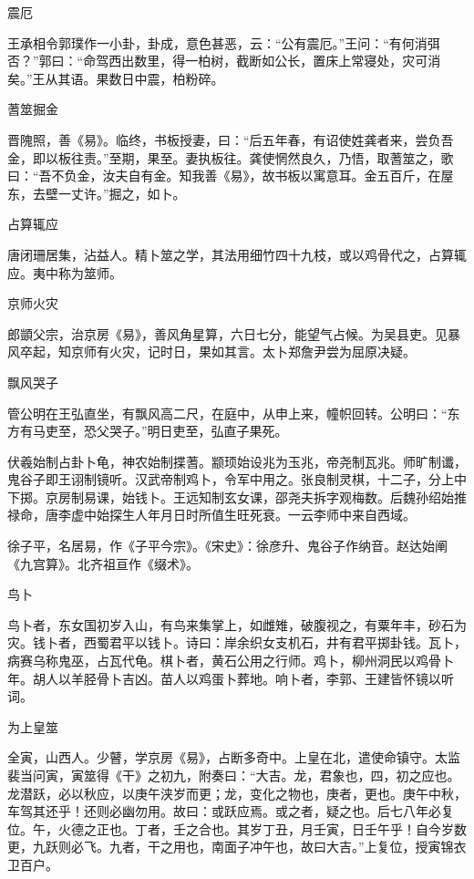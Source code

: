 \documentclass[a4paper,12pt,UTF8,twoside]{ctexbook}
\begin{document}
    震厄
    
    王承相令郭璞作一小卦，卦成，意色甚恶，云：“公有震厄。”王问：“有何消弭否？”郭曰：“命驾西出数里，得一柏树，截断如公长，置床上常寝处，灾可消矣。”王从其语。果数日中震，柏粉碎。
    
    蓍筮掘金
    
    晋隗照，善《易》。临终，书板授妻，曰：“后五年春，有诏使姓龚者来，尝负吾金，即以板往责。”至期，果至。妻执板往。龚使惘然良久，乃悟，取蓍筮之，歌曰：“吾不负金，汝夫自有金。知我善《易》，故书板以寓意耳。金五百斤，在屋东，去壁一丈许。”掘之，如卜。
    
    占算辄应
    
    唐闭珊居集，沾益人。精卜筮之学，其法用细竹四十九枝，或以鸡骨代之，占算辄应。夷中称为筮师。
    
    京师火灾
    
    郎顗父宗，治京房《易》，善风角星算，六日七分，能望气占候。为吴县吏。见暴风卒起，知京师有火灾，记时日，果如其言。太卜郑詹尹尝为屈原决疑。
    
    飘风哭子
    
    管公明在王弘直坐，有飘风高二尺，在庭中，从申上来，幢帜回转。公明曰：“东方有马吏至，恐父哭子。”明日吏至，弘直子果死。
    
    伏羲始制占卦卜龟，神农始制揲蓍。颛顼始设兆为玉兆，帝尧制瓦兆。师旷制谶，鬼谷子即王诩制镜听。汉武帝制鸡卜，令军中用之。张良制灵棋，十二子，分上中下掷。京房制易课，始钱卜。王远知制玄女课，邵尧夫拆字观梅数。后魏孙绍始推禄命，唐李虚中始探生人年月日时所值生旺死衰。一云李师中来自西域。
    
    徐子平，名居易，作《子平今宗》。《宋史》：徐彦升、鬼谷子作纳音。赵达始阐《九宫算》。北齐祖亘作《缀术》。
    
    鸟卜
    
    鸟卜者，东女国初岁入山，有鸟来集掌上，如雌雉，破腹视之，有粟年丰，砂石为灾。钱卜者，西蜀君平以钱卜。诗曰：岸余织女支机石，井有君平掷卦钱。瓦卜，病赛乌称鬼巫，占瓦代龟。棋卜者，黄石公用之行师。鸡卜，柳州洞民以鸡骨卜年。胡人以羊胫骨卜吉凶。苗人以鸡蛋卜葬地。响卜者，李郭、王建皆怀镜以听词。
    
    为上皇筮
    
    全寅，山西人。少瞽，学京房《易》，占断多奇中。上皇在北，遣使命镇守。太监裴当问寅，寅筮得《干》之初九，附奏曰：“大吉。龙，君象也，四，初之应也。龙潜跃，必以秋应，以庚午浃岁而更；龙，变化之物也，庚者，更也。庚午中秋，车驾其还乎！还则必幽勿用。故曰：或跃应焉。或之者，疑之也。后七八年必复位。午，火德之正也。丁者，壬之合也。其岁丁丑，月壬寅，日壬午乎！自今岁数更，九跃则必飞。九者，干之用也，南面子冲午也，故曰大吉。”上复位，授寅锦衣卫百户。
    
\end{document}
